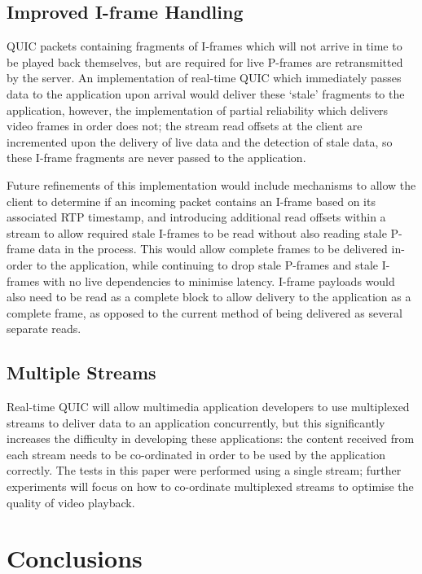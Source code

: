 \documentclass{mpaper}
\begin{document}
\subsection{Improved I-frame Handling}
QUIC packets containing fragments of I-frames which will not arrive in time to be played back themselves, but are required for live P-frames are retransmitted by the server. An implementation of real-time QUIC which immediately passes data to the application upon arrival would deliver these `stale' fragments to the application, however, the implementation of partial reliability which delivers video frames in order does not; the stream read offsets at the client are incremented upon the delivery of live data and the detection of stale data, so these I-frame fragments are never passed to the application.

Future refinements of this implementation would include mechanisms to allow the client to determine if an incoming packet contains an I-frame based on its associated RTP timestamp, and introducing additional read offsets within a stream to allow required stale I-frames to be read without also reading stale P-frame data in the process. This would allow complete frames to be delivered in-order to the application, while continuing to drop stale P-frames and stale I-frames with no live dependencies to minimise latency. I-frame payloads would also need to be read as a complete block to allow delivery to the application as a complete frame, as opposed to the current method of being delivered as several separate reads.

\subsection{Multiple Streams}
Real-time QUIC will allow multimedia application developers to use multiplexed streams to deliver data to an application concurrently, but this significantly increases the difficulty in developing these applications: the content received from each stream needs to be co-ordinated in order to be used by the application correctly. The tests in this paper were performed using a single stream; further experiments will focus on how to co-ordinate multiplexed streams to optimise the quality of video playback.

\section{Conclusions}
\end{document}
